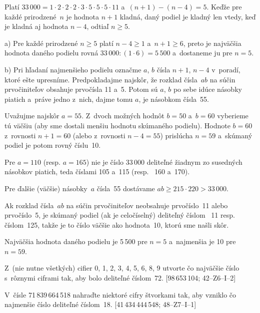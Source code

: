 {%
Platí
33\,$000=1\cdot2\cdot2\cdot2\cdot3\cdot5\cdot5\cdot5\cdot11$  
a~$(n+1)-(n-4)=5$. Keďže pre každé prirodzené~$n$ je hodnota $n+1$
kladná, daný podiel je kladný len vtedy, keď je kladná aj hodnota
$n-4$, odtiaľ $n\ge5$.

a) Pre každé prirodzené $n\ge5$ platí $n-4\ge1$ a~$n+1\ge6$, preto
je najväčšia hodnota daného podielu rovná
$33\,000:(1\cdot6)=5\,500$ a~dostaneme ju pre $n=5$.

b) Pri hľadaní najmenšieho podielu označme $a$, $b$ čísla
$n+1$, $n-4$ v~poradí, ktoré ešte upresníme. Predpokladajme
najskôr, že rozklad čísla~$ab$ na súčin prvočiniteľov obsahuje
prvočísla 11 a~5. Potom sú $a$, $b$ po sebe idúce násobky piatich  
a~práve jedno z~nich, dajme tomu $a$, je násobkom čísla~55.

Uvažujme najskôr $a=55$. Z~dvoch možných hodnôt $b=50$ a~$b=60$
vyberieme tú väčšiu (aby sme dostali menšiu hodnotu skúmaného podielu).
Hodnote $b=60$ z~rovnosti $n+1=60$ (alebo z~rovnosti $n-4=55$)
prislúcha $n=59$ a~skúmaný podiel je potom rovný číslu~10.

Pre $a=110$ (resp. $a=165$) nie je číslo 33\,000 deliteľné
žiadnym zo susedných násobkov piatich, teda číslami 105 a~115 (resp.~
160 a~170).

Pre ďalšie (väčšie) násobky~$a$ čísla~55 dostávame
$ab\ge215\cdot220>33\,000$.

Ak rozklad čísla~$ab$ na súčin prvočiniteľov neobsahuje
prvočíslo~11 alebo prvočíslo~5, je skúmaný podiel (ak je
celočíselný) deliteľný číslom~ 11 resp. číslom~125, takže
je to číslo väčšie ako hodnota~10, ktorú sme našli skôr.
                 
\zaver
Najväčšia hodnota daného podielu je 5\,500 pre $n=5$
a~najmenšia je 10 pre $n=59$.

Z~(nie nutne všetkých) cifier 0, 1, 2, 3, 4, 5, 6, 8, 9 utvorte čo
najväčšie číslo s~rôznymi ciframi tak, aby bolo deliteľné číslom~72.
[98\,653\,104; 42--Z6--I--2]

V~čísle 71\,839\,664\,518 nahraďte niektoré cifry štvorkami tak, aby
vzniklo čo najmenšie číslo deliteľné číslom~18.
[41\,434\,444\,548; 48--Z7--I--1]
}

